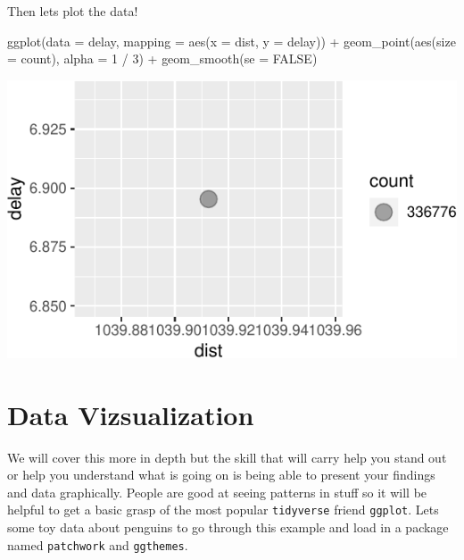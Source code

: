 \documentclass[]{tufte-handout}
\newenvironment{Shaded}{}{}
\newcommand{\AttributeTok}[1]{\textcolor[rgb]{0.49,0.56,0.16}{#1}}
\newcommand{\ConstantTok}[1]{\textcolor[rgb]{0.53,0.00,0.00}{#1}}
\newcommand{\DecValTok}[1]{\textcolor[rgb]{0.25,0.63,0.44}{#1}}
\newcommand{\FunctionTok}[1]{\textcolor[rgb]{0.02,0.16,0.49}{#1}}
\newcommand{\NormalTok}[1]{#1}
\newcommand{\SpecialCharTok}[1]{\textcolor[rgb]{0.25,0.44,0.63}{#1}}
\begin{document}
Then lets plot the data!

\begin{Shaded}
\begin{Highlighting}[]
\FunctionTok{ggplot}\NormalTok{(}\AttributeTok{data =}\NormalTok{ delay, }\AttributeTok{mapping =} \FunctionTok{aes}\NormalTok{(}\AttributeTok{x =}\NormalTok{ dist, }\AttributeTok{y =}\NormalTok{ delay)) }\SpecialCharTok{+}
  \FunctionTok{geom\_point}\NormalTok{(}\FunctionTok{aes}\NormalTok{(}\AttributeTok{size =}\NormalTok{ count), }\AttributeTok{alpha =} \DecValTok{1} \SpecialCharTok{/} \DecValTok{3}\NormalTok{) }\SpecialCharTok{+}
  \FunctionTok{geom\_smooth}\NormalTok{(}\AttributeTok{se =} \ConstantTok{FALSE}\NormalTok{)}
\end{Highlighting}
\end{Shaded}

\begin{center}\includegraphics{R-Guide_files/figure-latex/unnamed-chunk-11-1} \end{center}

\hypertarget{data-vizsualization}{%
\section{Data Vizsualization}\label{data-vizsualization}}

We will cover this more in depth but the skill that will carry help you
stand out or help you understand what is going on is being able to
present your findings and data graphically. People are good at seeing
patterns in stuff so it will be helpful to get a basic grasp of the most
popular \texttt{tidyverse} friend \texttt{ggplot}. Lets some toy data
about penguins to go through this example and load in a package named
\texttt{patchwork} and \texttt{ggthemes}.
\end{document}

